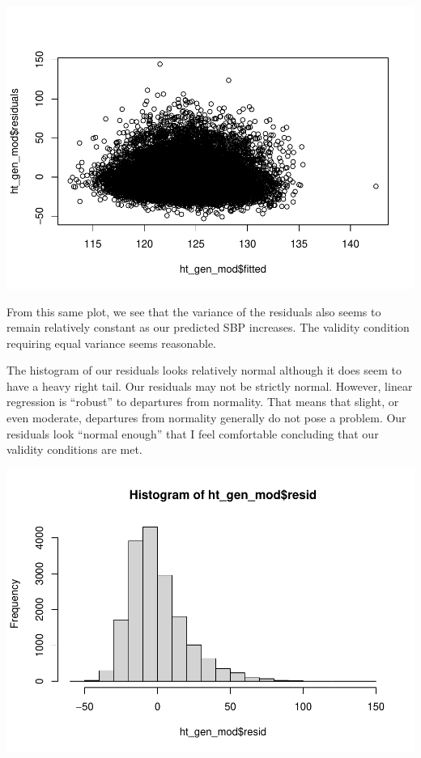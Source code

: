 \documentclass[
]{book}
\newenvironment{Shaded}{\begin{snugshade}}{\end{snugshade}}
\newcommand{\FunctionTok}[1]{\textcolor[rgb]{0.00,0.00,0.00}{#1}}
\newcommand{\NormalTok}[1]{#1}
\newcommand{\SpecialCharTok}[1]{\textcolor[rgb]{0.00,0.00,0.00}{#1}}
\begin{document}
\includegraphics{MA206supplement_files/figure-latex/unnamed-chunk-8-1.pdf}

From this same plot, we see that the variance of the residuals also seems to remain relatively constant as our predicted SBP increases. The validity condition requiring equal variance seems reasonable.

The histogram of our residuals looks relatively normal although it does seem to have a heavy right tail. Our residuals may not be strictly normal. However, linear regression is ``robust'' to departures from normality. That means that slight, or even moderate, departures from normality generally do not pose a problem. Our residuals look ``normal enough'' that I feel comfortable concluding that our validity conditions are met.

\begin{Shaded}
\end{Shaded}

\includegraphics{MA206supplement_files/figure-latex/unnamed-chunk-9-1.pdf}
\end{document}
